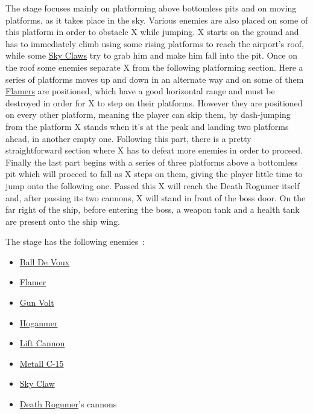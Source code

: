 The stage focuses mainly on platforming above bottomless pits and on moving platforms, as it takes place in the sky. Various enemies are also placed on some of this platform in order to obstacle X while jumping. X starts on the ground and has to immediately climb using some rising platforms to reach the airport's roof, while some \hyperlink{enem:Sky_Claw}{Sky Claws} try to grab him and make him fall into the pit. Once on the roof some enemies separate X from the following  platforming section. Here a series of platforms moves up and down in an alternate way and on some of them \hyperlink{enem:Flamer}{Flamers} are positioned, which have a good horizontal range and must be destroyed in order for X to step on their platforms. However they are positioned on every other platform, meaning the player can skip them, by dash-jumping from the platform X stands when it's at the peak and landing two platforms ahead, in another empty one. Following this part, there is a pretty straightforward section where X has to defeat more enemies in order to proceed. Finally the last part begins with a series of three platforms above a bottomless pit which will proceed to fall as X steps on them, giving the player little time to jump onto the following one. Passed this X will reach the Death Rogumer itself and, after passing its two cannons, X will stand in front of the boss door. On the far right of the ship, before entering the boss, a weapon tank and a health tank are present onto the ship wing.

The stage has the following enemies~\cite{wiki:Airport}:
\begin{itemize}
	\item \hyperlink{enem:Ball_De_Voux}{Ball De Voux }
	\item \hyperlink{enem:Flamer}{Flamer}
	\item \hyperlink{enem:Gun_Volt}{Gun Volt}
	\item \hyperlink{enem:Hoganmer}{Hoganmer}
	\item \hyperlink{enem:Lift_Cannon}{Lift Cannon}
	\item \hyperlink{enem:Metall_C-15}{Metall C-15}
	\item \hyperlink{enem:Sky_Claw}{Sky Claw}
	\item \hyperlink{vehicle:Death_Rogumer}{Death Rogumer}'s cannons
\end{itemize}

